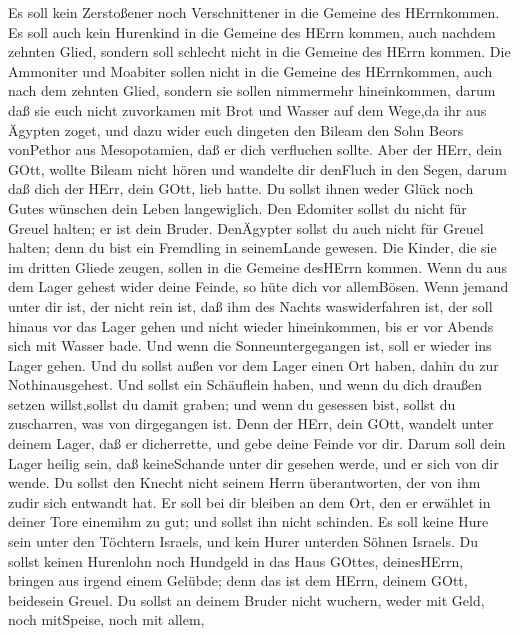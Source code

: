 Es soll kein Zerstoßener noch Verschnittener in die Gemeine
des HErrnkommen.  Es soll auch kein Hurenkind in die Gemeine
des HErrn kommen, auch nachdem zehnten Glied, sondern soll schlecht
nicht in die Gemeine des HErrn kommen.  Die Ammoniter und
Moabiter sollen nicht in die Gemeine des HErrnkommen, auch nach dem
zehnten Glied, sondern sie sollen nimmermehr hineinkommen, 
darum daß sie euch nicht zuvorkamen mit Brot und Wasser auf dem Wege,da
ihr aus Ägypten zoget, und dazu wider euch dingeten den Bileam den Sohn
Beors vonPethor aus Mesopotamien, daß er dich verfluchen sollte.
 Aber der HErr, dein GOtt, wollte Bileam nicht hören und
wandelte dir denFluch in den Segen, darum daß dich der HErr, dein GOtt,
lieb hatte.  Du sollst ihnen weder Glück noch Gutes wünschen
dein Leben langewiglich.  Den Edomiter sollst du nicht für
Greuel halten; er ist dein Bruder. DenÄgypter sollst du auch nicht für
Greuel halten; denn du bist ein Fremdling in seinemLande gewesen.
 Die Kinder, die sie im dritten Gliede zeugen, sollen in die
Gemeine desHErrn kommen.  Wenn du aus dem Lager gehest wider
deine Feinde, so hüte dich vor allemBösen.  Wenn jemand
unter dir ist, der nicht rein ist, daß ihm des Nachts waswiderfahren
ist, der soll hinaus vor das Lager gehen und nicht wieder hineinkommen,
 bis er vor Abends sich mit Wasser bade. Und wenn die
Sonneuntergegangen ist, soll er wieder ins Lager gehen. 
Und du sollst außen vor dem Lager einen Ort haben, dahin du zur
Nothinausgehest.  Und sollst ein Schäuflein haben, und wenn
du dich draußen setzen willst,sollst du damit graben; und wenn du
gesessen bist, sollst du zuscharren, was von dirgegangen ist.
 Denn der HErr, dein GOtt, wandelt unter deinem Lager, daß
er dicherrette, und gebe deine Feinde vor dir. Darum soll dein Lager
heilig sein, daß keineSchande unter dir gesehen werde, und er sich von
dir wende.  Du sollst den Knecht nicht seinem Herrn
überantworten, der von ihm zudir sich entwandt hat.  Er
soll bei dir bleiben an dem Ort, den er erwählet in deiner Tore einemihm
zu gut; und sollst ihn nicht schinden.  Es soll keine Hure
sein unter den Töchtern Israels, und kein Hurer unterden Söhnen Israels.
 Du sollst keinen Hurenlohn noch Hundgeld in das Haus
GOttes, deinesHErrn, bringen aus irgend einem Gelübde; denn das ist dem
HErrn, deinem GOtt, beidesein Greuel.  Du sollst an deinem
Bruder nicht wuchern, weder mit Geld, noch mitSpeise, noch mit allem,
